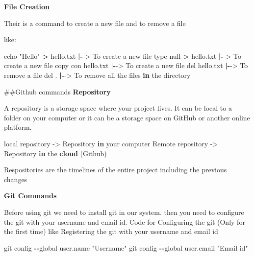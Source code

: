 \documentclass[
]{article}
\newenvironment{Shaded}{\begin{snugshade}}{\end{snugshade}}
\newcommand{\ControlFlowTok}[1]{\textcolor[rgb]{0.13,0.29,0.53}{\textbf{#1}}}
\newcommand{\FunctionTok}[1]{\textcolor[rgb]{0.13,0.29,0.53}{\textbf{#1}}}
\newcommand{\NormalTok}[1]{#1}
\newcommand{\OtherTok}[1]{\textcolor[rgb]{0.56,0.35,0.01}{#1}}
\newcommand{\SpecialCharTok}[1]{\textcolor[rgb]{0.81,0.36,0.00}{\textbf{#1}}}
\newcommand{\StringTok}[1]{\textcolor[rgb]{0.31,0.60,0.02}{#1}}
\begin{document}
\textbf{File Creation}

Their is a command to create a new file and to remove a file

like:

\begin{Shaded}
\begin{Highlighting}[]
\NormalTok{echo }\StringTok{"Hello"} \SpecialCharTok{\textgreater{}}\NormalTok{ hello.txt }\SpecialCharTok{|{-}}\OtherTok{{-}\textgreater{}}\NormalTok{ To create a new file}
\NormalTok{type null }\SpecialCharTok{\textgreater{}}\NormalTok{ hello.txt }\SpecialCharTok{|{-}}\OtherTok{{-}\textgreater{}}\NormalTok{ To create a new file}
\NormalTok{copy con hello.txt }\SpecialCharTok{|{-}}\OtherTok{{-}\textgreater{}}\NormalTok{ To create a new file}
\NormalTok{del hello.txt }\SpecialCharTok{|{-}}\OtherTok{{-}\textgreater{}}\NormalTok{ To remove a file}
\NormalTok{del . }\SpecialCharTok{|{-}}\OtherTok{{-}\textgreater{}}\NormalTok{ To remove all the files }\ControlFlowTok{in}\NormalTok{ the directory}
\end{Highlighting}
\end{Shaded}

\newpage

\#\#Github commands \textbf{Repository}

A repository is a storage space where your project lives. It can be
local to a folder on your computer or it can be a storage space on
GitHub or another online platform.

\begin{Shaded}
\begin{Highlighting}[]
\NormalTok{local repository }\OtherTok{{-}\textgreater{}}\NormalTok{ Repository }\ControlFlowTok{in}\NormalTok{ your computer}
\NormalTok{Remote repository }\OtherTok{{-}\textgreater{}}\NormalTok{ Repository }\ControlFlowTok{in}\NormalTok{ the }\FunctionTok{cloud}\NormalTok{ (Github)}
\end{Highlighting}
\end{Shaded}

Respositories are the timelines of the entire project including the
previous changes

\textbf{Git Commands}

Before using git we need to install git in our system. then you need to
configure the git with your username and email id. Code for Configuring
the git (Only for the first time) like Registering the git with your
username and email id

\begin{Shaded}
\begin{Highlighting}[]
\NormalTok{git config }\SpecialCharTok{{-}{-}}\NormalTok{global user.name }\StringTok{"Username"}
\NormalTok{git config }\SpecialCharTok{{-}{-}}\NormalTok{global user.email }\StringTok{"Email id"}
\end{Highlighting}
\end{Shaded}
\end{document}
